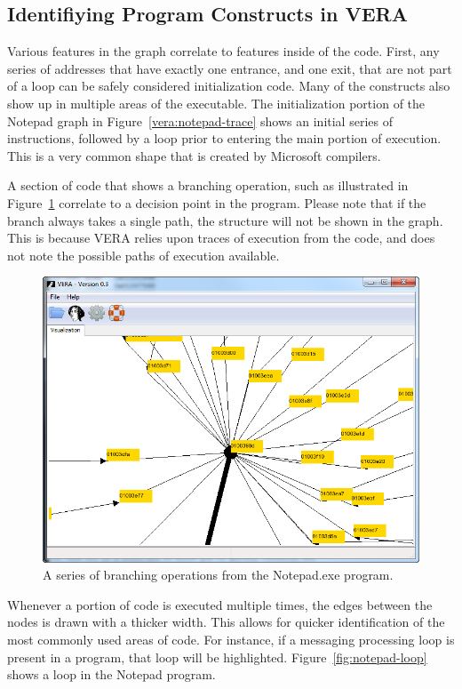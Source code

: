 \documentclass[11pt]{article}
\begin{document}
\subsection{Identifiying Program Constructs in VERA}

Various features in the graph correlate to features inside of the
code. First, any series of addresses that have exactly one entrance,
and one exit, that are not part of a loop can be safely
considered initialization code. Many of the constructs also show up in
multiple areas of the executable. The initialization portion of the
Notepad graph in Figure~\ref{vera:notepad-trace} shows an initial
series of instructions, followed by a loop prior to entering the main
portion of execution. This is a very common shape that is created by
Microsoft compilers. 

A section of code that shows a branching operation, such as
illustrated in Figure~\ref{fig:notepad-branch} correlate to a decision
point in the program. Please note that if the branch always takes a
single path, the structure will not be shown in the graph. This is
because VERA relies upon traces of execution from the code, and does
not note the possible paths of execution available.

\begin{figure}[htb]
  \centering
  \includegraphics[width=5.0in]{vera-notepad-trace-zoom3.png}
  \caption{A series of branching operations from the Notepad.exe program.}\label{fig:notepad-branch}
\end{figure}

Whenever a portion of code is executed multiple times, the edges
between the nodes is drawn with a thicker width. This allows for
quicker identification of the most commonly used areas of code. For
instance, if a messaging processing loop is present in a program, that
loop will be highlighted. Figure~\ref{fig:notepad-loop} shows a loop
in the Notepad program.
\end{document}
